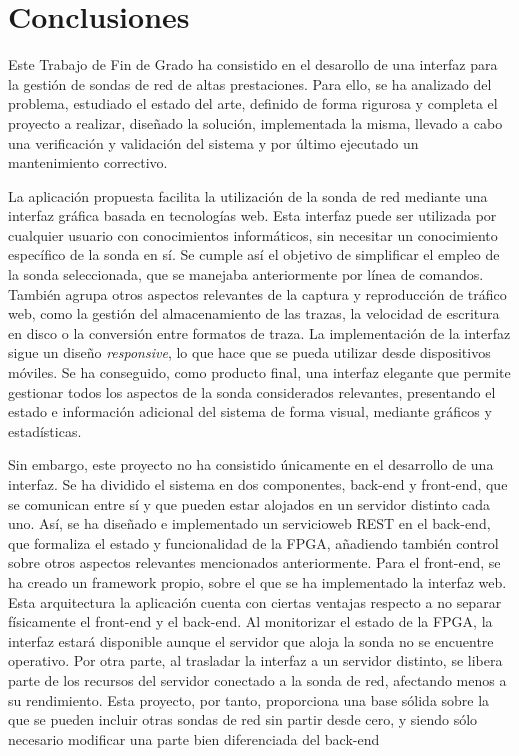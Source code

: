 \chapter{Conclusiones\label{cap:conclusiones}}

Este Trabajo de Fin de Grado ha consistido en el desarollo de una interfaz para la gestión de sondas de red de altas prestaciones.
Para ello, se ha analizado del problema, estudiado el estado del arte, definido de forma rigurosa y completa el proyecto a realizar, diseñado la solución, implementada la misma, llevado a cabo una verificación y validación del sistema y por último ejecutado un mantenimiento correctivo.

La aplicación propuesta facilita la utilización de la sonda de red mediante una interfaz gráfica basada en tecnologías web.
Esta interfaz puede ser utilizada por cualquier usuario con conocimientos informáticos, sin necesitar un conocimiento específico de la sonda en sí.
Se cumple así el objetivo de simplificar el empleo de la sonda seleccionada, que se manejaba anteriormente por línea de comandos.
También agrupa otros aspectos relevantes de la captura y reproducción de tráfico web, como la gestión del almacenamiento de las \glspl{traza}, la velocidad de escritura en disco o la conversión entre formatos de \gls{traza}.
La implementación de la interfaz sigue un diseño \textit{responsive}, lo que hace que se pueda utilizar desde dispositivos móviles.
Se ha conseguido, como producto final, una interfaz elegante que permite gestionar todos los aspectos de la sonda considerados relevantes, presentando el estado e información adicional del sistema de forma visual, mediante gráficos y estadísticas.

Sin embargo, este proyecto no ha consistido únicamente en el desarrollo de una interfaz.
Se ha dividido el sistema en dos componentes, \gls{back-end} y \gls{front-end}, que se comunican entre sí y que pueden estar alojados en un servidor distinto cada uno.
Así, se ha diseñado e implementado un \gls{servicioweb} \gls{REST} en el \gls{back-end}, que formaliza el estado y funcionalidad de la \gls{FPGA}, añadiendo también control sobre otros aspectos relevantes mencionados anteriormente.
Para el \gls{front-end}, se ha creado un \gls{framework} propio, sobre el que se ha implementado la interfaz web.
Esta arquitectura la aplicación cuenta con ciertas ventajas respecto a no separar físicamente el \gls{front-end} y el \gls{back-end}.
Al monitorizar el estado de la \gls{FPGA}, la interfaz estará disponible aunque el servidor que aloja la sonda no se encuentre operativo.
Por otra parte, al trasladar la interfaz a un servidor distinto, se libera parte de los recursos del servidor conectado a la sonda de red, afectando menos a su rendimiento.
Esta proyecto, por tanto, proporciona una base sólida sobre la que se pueden incluir otras sondas de red sin partir desde cero, y siendo sólo necesario modificar una parte bien diferenciada del \gls{back-end}


